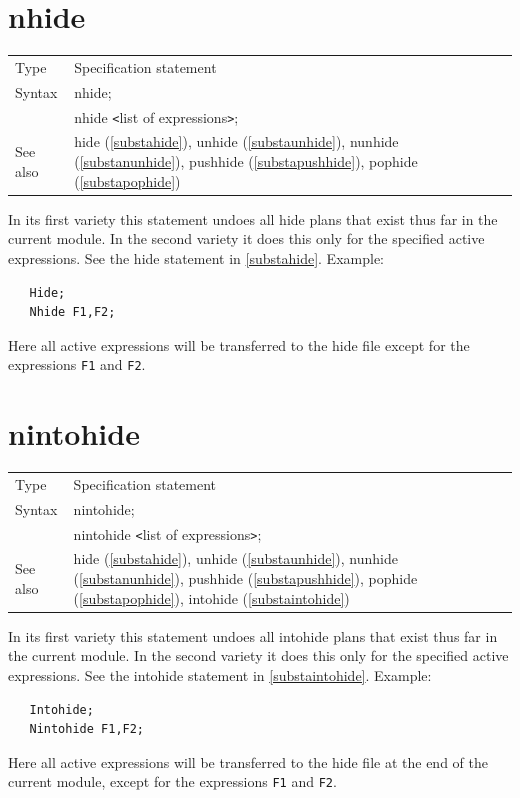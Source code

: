\section{nhide}
\label{substanhide}

\noindent \begin{tabular}{ll}
Type & Specification statement\\
Syntax & nhide; \\
       & nhide {\tt<}list of expressions{\tt>};
\\ See also & hide (\ref{substahide}),
              unhide (\ref{substaunhide}),
              nunhide (\ref{substanunhide}),
              pushhide (\ref{substapushhide}),
              pophide (\ref{substapophide})
\end{tabular} \vspace{4mm}

\noindent In its first variety this statement undoes all 
hide plans that exist thus far in the current module. In the 
second variety it does this only for the specified active 
expressions. See the hide statement in \ref{substahide}. Example:
\begin{verbatim}
   Hide;
   Nhide F1,F2;
\end{verbatim}
Here all active expressions will be transferred to the hide file except for 
the expressions \verb:F1: and \verb:F2:. \vspace{10mm}


\section{nintohide}
\label{substanintohide}

\noindent \begin{tabular}{ll}
Type & Specification statement\\
Syntax & nintohide; \\
       & nintohide {\tt<}list of expressions{\tt>};
\\ See also & hide (\ref{substahide}),
              unhide (\ref{substaunhide}),
              nunhide (\ref{substanunhide}),
              pushhide (\ref{substapushhide}),
              pophide (\ref{substapophide}),
              intohide (\ref{substaintohide})
\end{tabular} \vspace{4mm}

\noindent In its first variety this statement undoes all
intohide plans that exist thus far in the current module. In the
second variety it does this only for the specified active
expressions. See the intohide statement in \ref{substaintohide}. Example:
\begin{verbatim}
   Intohide;
   Nintohide F1,F2;
\end{verbatim}
Here all active expressions will be transferred to the hide file at the end of the
current module, except for the expressions \verb:F1: and \verb:F2:. \vspace{10mm}

